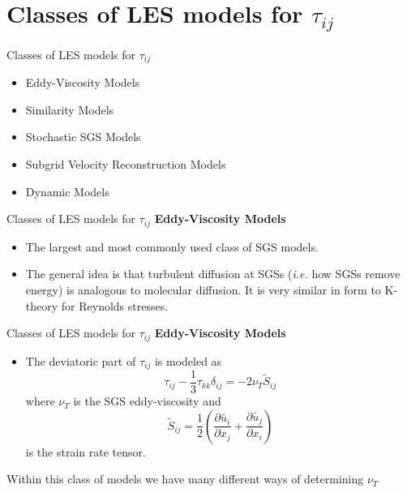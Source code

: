 \section{Classes of LES models for $\tau_{ij}$} %

\begin{frame}{Classes of LES models for $\tau_{ij}$}

\begin{itemize}
	\item Eddy-Viscosity Models
	\item Similarity Models
	\item Stochastic SGS Models
	\item Subgrid Velocity Reconstruction Models
	\item Dynamic Models
\end{itemize}

\end{frame}


\begin{frame}{Classes of LES models for $\tau_{ij}$}
\textbf{Eddy-Viscosity Models}
\begin{itemize}
	\item The largest and most commonly used class of SGS models.
	\item The general idea is that turbulent diffusion at SGSs (\textit{i.e.} how SGSs remove energy) is analogous to molecular diffusion. It is very similar in form to K-theory for Reynolds stresses.
\end{itemize}

\end{frame}


\begin{frame}{Classes of LES models for $\tau_{ij}$}
\textbf{Eddy-Viscosity Models}
\begin{itemize}
	\item The deviatoric part of $\tau_{ij}$ is modeled as
	$$\tau_{ij} - \frac{1}{3}\tau_{kk}\delta_{ij} = -2\nu_{T} \widetilde{S}_{ij}$$
	where $\nu_T$ is the SGS eddy-viscosity and 
	$$\widetilde{S}_{ij} = \frac{1}{2}\left( \frac{\partial \widetilde{u_i}}{\partial x_j} + \frac{\partial \widetilde{u_j}}{\partial x_i} \right)$$ is the strain rate tensor.
\end{itemize}
Within this class of models we have many different ways of determining $\nu_T$
\end{frame}



